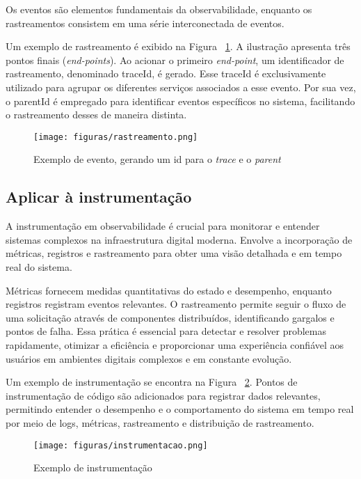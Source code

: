 \documentclass[12pt]{article}
\begin{document}
Os eventos são elementos fundamentais da observabilidade, enquanto os rastreamentos consistem em uma série interconectada de eventos. 

Um exemplo de rastreamento é exibido na Figura ~\ref{fig:rastreamento}. A ilustração apresenta três pontos finais (\textit{end-points}). Ao acionar o primeiro \textit{end-point}, um identificador de rastreamento, denominado traceId, é gerado. Esse traceId é exclusivamente utilizado para agrupar os diferentes serviços associados a esse evento. Por sua vez, o parentId é empregado para identificar eventos específicos no sistema, facilitando o rastreamento desses de maneira distinta. 

\begin{figure}[!htb]
\centering
\texttt{[image: figuras/rastreamento.png]}
\caption{Exemplo de evento, gerando um id para o \textit{trace} e o \textit{parent}}
\label{fig:rastreamento}
\end{figure}

\subsection{Aplicar à instrumentação}

A instrumentação em observabilidade é crucial para monitorar e entender sistemas complexos na infraestrutura digital moderna. Envolve a incorporação de métricas, registros e rastreamento para obter uma visão detalhada e em tempo real do sistema. 

Métricas fornecem medidas quantitativas do estado e desempenho, enquanto registros registram eventos relevantes. O rastreamento permite seguir o fluxo de uma solicitação através de componentes distribuídos, identificando gargalos e pontos de falha. Essa prática é essencial para detectar e resolver problemas rapidamente, otimizar a eficiência e proporcionar uma experiência confiável aos usuários em ambientes digitais complexos e em constante evolução.

Um exemplo de instrumentação se encontra na Figura ~\ref{fig:instrumentacao}. Pontos de instrumentação de código são adicionados para registrar dados relevantes, permitindo entender o desempenho e o comportamento do sistema em tempo real por meio de logs, métricas, rastreamento e distribuição de rastreamento.

\begin{figure}[!htb]
\centering
\texttt{[image: figuras/instrumentacao.png]}
\caption{Exemplo de instrumentação}
\label{fig:instrumentacao}
\end{figure}
\end{document}
